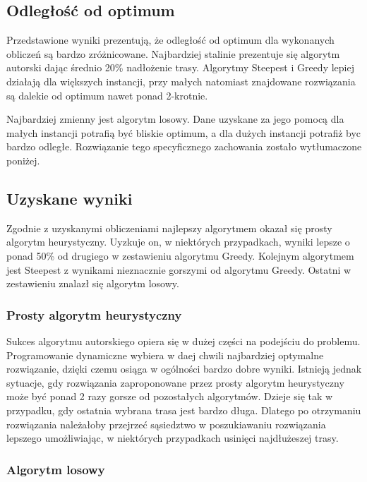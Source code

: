 \subsection{Odległość od optimum}

Przedstawione wyniki prezentują, że odległość od optimum dla wykonanych obliczeń 
są bardzo zróżnicowane. Najbardziej stalinie prezentuje się algorytm autorski 
dając średnio 20\% nadłożenie trasy. Algorytmy Steepest i Greedy lepiej działają dla 
większych instancji, przy małych natomiast znajdowane rozwiązania są dalekie od optimum
nawet ponad 2-krotnie.

Najbardziej zmienny jest algorytm losowy. Dane uzyskane za jego pomocą dla małych instancji
potrafią być bliskie optimum, a dla dużych instancji potrafiż byc bardzo odległe. Rozwiązanie
tego specyficznego zachowania zostało wytłumaczone poniżej.

\subsection{Uzyskane wyniki}

Zgodnie z uzyskanymi obliczeniami najlepszy algorytmem okazał się prosty algorytm 
heurystyczny. Uyzkuje on, w niektórych przypadkach, wyniki lepsze o ponad 50\% od
drugiego w zestawieniu algorytmu Greedy. Kolejnym algorytmem jest Steepest z wynikami 
nieznacznie gorszymi od algorytmu Greedy. Ostatni w zestawieniu znalazł się algorytm 
losowy.

\subsubsection{Prosty algorytm heurystyczny}

Sukces algorytmu autorskiego opiera się w dużej części na podejściu do problemu. 
Programowanie dynamiczne wybiera w daej chwili najbardziej optymalne rozwiązanie, 
dzięki czemu osiąga w ogólności bardzo dobre wyniki. Istnieją jednak sytuacje, gdy 
rozwiązania zaproponowane przez prosty algorytm heurystyczny może być ponad 2 razy 
gorsze od pozostałych algorytmów. Dzieje się tak w przypadku, gdy ostatnia wybrana 
trasa jest bardzo długa. Dlatego po otrzymaniu rozwiązania należałoby przejrzeć 
sąsiedztwo w poszukiawaniu rozwiązania lepszego umożliwiając, w niektórych przypadkach
usinięci najdłużeszej trasy.

\subsubsection{Algorytm losowy}

